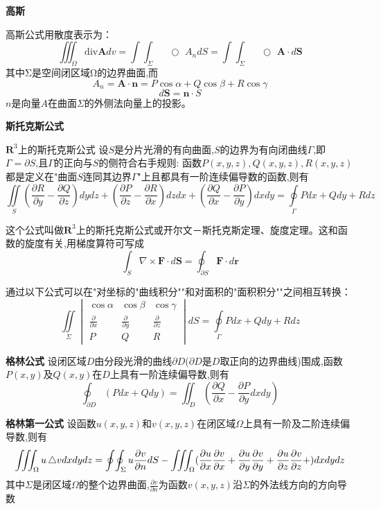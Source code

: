 \documentclass{article}
\begin{document}
\bigskip
\textbf{高斯}

高斯公式用散度表示为：
$$
\iiint_{\Omega}\mathrm{div}\mathbf{A}dv=
\int\!\!\!\!\int_{\Sigma}\!\!\!\!\!\!\!\!\!\!\!\!\!\!\;\;\;\bigcirc\,\,A_{n}dS
=
\int\!\!\!\!\int_{\Sigma}\!\!\!\!\!\!\!\!\!\!\!\!\!\!\;\;\;\bigcirc\,\,\mathbf{A}\cdot d\mathbf{S}
$$
其中Σ是空间闭区域Ω的边界曲面,而
$$
A_n=\mathbf{A}\cdot\mathbf{n}=P\cos\alpha+Q\cos\beta+R\cos\gamma
$$
$$
d\mathbf{S}=\mathbf{n}\cdot S
$$
$n$是向量$A$在曲面$\Sigma$的外侧法向量上的投影。

\bigskip
\textbf{斯托克斯公式}

$\mathbf{R}^3$上的斯托克斯公式
设$S$是分片光滑的有向曲面,$S$的边界为有向闭曲线$Γ$,即$\Gamma=\partial S$,且$Γ$的正向与$S$的侧符合右手规则: 函数$P(x,y,z),Q(x,y,z),R(x,y,z)$都是定义在"曲面$S$连同其边界$Γ$"上且都具有一阶连续偏导数的函数,则有
$$\iint\limits_{S}(\frac{\partial R}{\partial y}-\frac{\partial Q}{\partial z})dydz+(\frac{\partial P}{\partial z}-\frac{\partial R}{\partial x})dzdx+(\frac{\partial Q}{\partial x}-\frac{\partial P}{\partial y})dxdy
=\oint\limits_{\Gamma}Pdx+Qdy+Rdz$$

这个公式叫做$\mathbf{R}^3$上的斯托克斯公式或开尔文－斯托克斯定理、旋度定理。这和函数的旋度有关,用梯度算符可写成
$$
 \int_{S} \nabla \times \mathbf{F} \cdot d\mathbf{S} = \oint_{\partial S} \mathbf{F} \cdot d \mathbf{r}
$$

通过以下公式可以在"对坐标的"曲线积分""和对面积的"面积积分""之间相互转换：
$$
\iint\limits_{\Sigma}\begin{vmatrix} \cos \alpha & \cos \beta & \cos \gamma \\ \frac{\partial}{\partial x} & \frac{\partial}{\partial y} & \frac{\partial}{\partial z} \\ P & Q & R \end{vmatrix}dS=\oint\limits_{\Gamma}Pdx+Qdy+Rdz
$$

\bigskip
\textbf{格林公式}
设闭区域$D$由分段光滑的曲线$\partial D$($\partial D$是$D$取正向的边界曲线)围成,函数$P(x,y)$及$Q(x,y)$在$D$上具有一阶连续偏导数,则有
$$\oint_{\partial D} (Pdx+Qdy) = \iint_D (\frac{\partial Q}{\partial x} - \frac{\partial  P}{\partial y}dxdy)$$

\bigskip
\textbf{格林第一公式}
设函数$u(x,y,z)$和$v(x,y,z)$在闭区域$\Omega$上具有一阶及二阶连续偏导数,则有
$$\iiint_{\Omega} u\mathop{}\!\mathbin\bigtriangleup v dxdydz
=
\oint\!\oint_{\Sigma} u \frac{\partial v}{\partial n}dS -
\iiint_{\Omega}(
\frac{\partial  u}{\partial x}\frac{\partial v}{\partial x}+
\frac{\partial  u}{\partial y}\frac{\partial v}{\partial y}+
\frac{\partial  u}{\partial z}\frac{\partial v}{\partial z}+
)dxdydz$$
其中$\Sigma$是闭区域$\Omega$的整个边界曲面,$\frac{\partial v}{\partial n}$为函数$v(x,y,z)$沿$\Sigma$的外法线方向的方向导数
\end{document}
